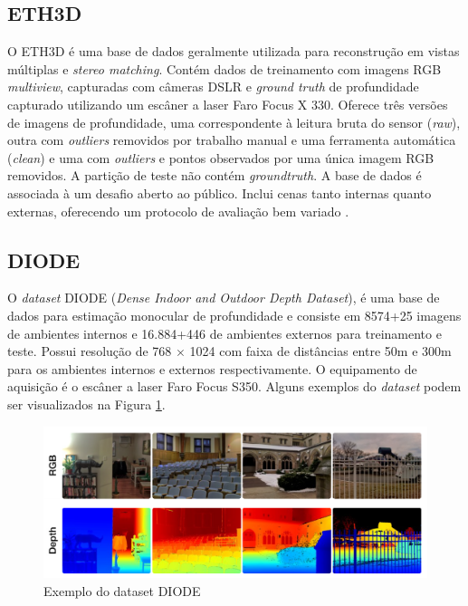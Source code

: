 \subsection{ETH3D}

O ETH3D é uma base de dados geralmente utilizada para reconstrução em vistas múltiplas e \textit{stereo matching}. Contém dados de treinamento com imagens RGB \textit{multiview}, capturadas com câmeras DSLR e \textit{ground truth} de profundidade capturado utilizando um escâner a laser Faro Focus X 330. Oferece três versões de imagens de profundidade, uma correspondente à leitura bruta do sensor (\textit{raw}), outra com \textit{outliers} removidos por trabalho manual e uma ferramenta automática (\textit{clean}) e uma com \textit{outliers} e pontos observados por uma única imagem RGB removidos. A partição de teste não contém \textit{groundtruth}. A base de dados é associada à um desafio aberto ao público. Inclui cenas tanto internas quanto externas, oferecendo um protocolo de avaliação bem variado \cite{lahiri2024deep} \cite{schops2019bad}. 

\subsection{DIODE}

O \textit{dataset} DIODE (\textit{Dense Indoor and Outdoor Depth Dataset}), é uma base de dados para estimação monocular de profundidade e consiste em 8574+25 imagens de ambientes internos e 16.884+446 de ambientes externos para treinamento e teste. Possui resolução de 768 $\times$ 1024 com faixa de distâncias entre 50m e 300m para os ambientes internos e externos respectivamente. O equipamento de aquisição é o escâner a laser Faro Focus S350. Alguns exemplos do \textit{dataset} podem ser visualizados na Figura \ref{exdiode}.

\begin{figure}[h]
    \centering
    \includegraphics[width=\textwidth]{fig/example_diode.png}
    \caption{Exemplo do dataset DIODE}
    \label{exdiode}
\end{figure}

